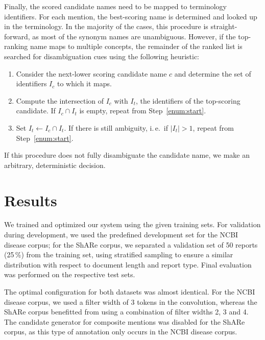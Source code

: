 \documentclass{bioinfo}
\newcommand{\ie}{i.\,e.\ }
\begin{document}
Finally, the scored candidate names need to be mapped to terminology identifiers.
For each mention, the best-scoring name is determined and looked up in the terminology.
In the majority of the cases, this procedure is straight-forward, as most of the synonym names are unambiguous.  %
However, if the top-ranking name maps to multiple concepts, the remainder of the ranked list is searched for disambiguation cues using the following heuristic:
\begin{enumerate}
  \item\label{enum:start} Consider the next-lower scoring candidate name $c$ and determine the set of identifiers $I_c$ to which it maps.
  \item Compute the intersection of $I_c$ with $I_t$, the identifiers of the top-scoring candidate. If $I_c \cap I_t$ is empty, repeat from Step~\ref{enum:start}.
  \item Set $I_t \leftarrow I_c \cap I_t$. If there is still ambiguity, \ie if $|I_t| > 1$, repeat from Step~\ref{enum:start}.
\end{enumerate}
If this procedure does not fully disambiguate the candidate name, we make an arbitrary, deterministic decision.




\section{Results}

We trained and optimized our system using the given training sets.
For validation during development, we used the predefined development set for the NCBI disease corpus; for the ShARe corpus, we separated a validation set of 50 reports (25\,\%) from the training set, using stratified sampling to ensure a similar distribution with respect to document length and report type.
Final evaluation was performed on the respective test sets.

The optimal configuration for both datasets was almost identical.
For the NCBI disease corpus, we used a filter width of 3 tokens in the convolution, whereas the ShARe corpus benefitted from using a combination of filter widths 2, 3 and 4.
The candidate generator for composite mentions was disabled for the ShARe corpus, as this type of annotation only occurs in the NCBI disease corpus.
\end{document}
